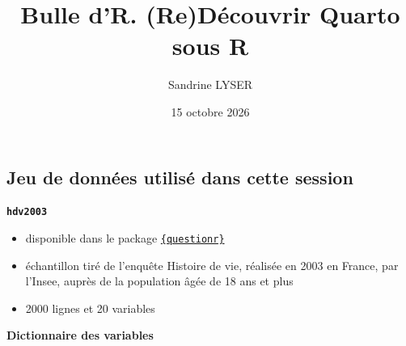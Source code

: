 \documentclass[
  french,
  10pt,
  a4paper,
]{article}
\title{Bulle d'R. (Re)Découvrir Quarto sous R}
\author{Sandrine LYSER}
\date{15 octobre 2026}
\providecommand{\tightlist}{%
  \setlength{\itemsep}{0pt}\setlength{\parskip}{0pt}}
\renewcommand*\contentsname{Table des matières}
\newcommand\contentsname{Table des matières}
\begin{document}
\maketitle

\renewcommand*\contentsname{Table des matières}
{
\setcounter{tocdepth}{3}
\tableofcontents
}

\thispagestyle{firstpage}
\pagebreak

\section*{}\label{section}

\subsection*{Jeu de données utilisé dans cette
session}\label{jeu-de-donnuxe9es-utilisuxe9-dans-cette-session}

\textbf{\texttt{hdv2003}}

\begin{itemize}
\tightlist
\item
  disponible dans le package
  \href{https://juba.github.io/questionr/index.html}{\texttt{\{questionr\}}}
\item
  échantillon tiré de l'enquête Histoire de vie, réalisée en 2003 en
  France, par l'Insee, auprès de la population âgée de 18 ans et plus
\item
  2000 lignes et 20 variables
\end{itemize}

\textbf{Dictionnaire des variables}
\end{document}
